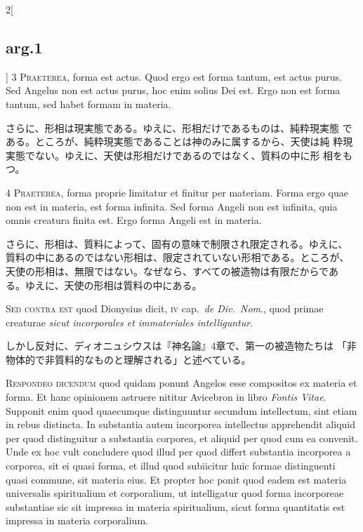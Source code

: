 \documentclass[paper=a4paper,fontsize=10pt,jafontsize=9pt,titlepage]{jlreq}
\begin{document}
\begin{paracol}{2}[\subsection{arg.1}]
{\scshape 3 Praeterea}, forma est actus. Quod ergo est forma tantum,
 est actus purus. Sed Angelus non est actus purus, hoc enim solius Dei
 est. Ergo non est forma tantum, sed habet formam in materia.

\switchcolumn

さらに、形相は現実態である。ゆえに、形相だけであるものは、純粋現実態
 である。ところが、純粋現実態であることは神のみに属するから、天使は純
 粋現実態でない。ゆえに、天使は形相だけであるのではなく、質料の中に形
 相をもつ。


{\scshape 4 Praeterea}, forma proprie limitatur et finitur per
 materiam. Forma ergo quae non est in materia, est forma infinita. Sed
 forma Angeli non est infinita, quia omnis creatura finita est. Ergo
 forma Angeli est in materia.

\switchcolumn

さらに、形相は、質料によって、固有の意味で制限され限定される。ゆえに、
 質料の中にあるのではない形相は、限定されていない形相である。ところが、
 天使の形相は、無限ではない。なぜなら、すべての被造物は有限だからであ
 る。ゆえに、天使の形相は質料の中にある。

\switchcolumn*[\subsection{s.c.}]

{\scshape Sed contra est} quod Dionysius dicit, {\scshape iv}
 cap.~{\itshape de Div.~Nom}., quod primae creaturae {\itshape sicut
 incorporales et immateriales intelliguntur}.

\switchcolumn

しかし反対に、ディオニュシウスは『神名論』4章で、第一の被造物たちは
 「非物体的で非質料的なものと理解される」と述べている。


{\scshape Respondeo dicendum} quod quidam ponunt Angelos esse
 compositos ex materia et forma. Et hanc opinionem astruere nititur
 Avicebron in libro {\itshape Fontis Vitae}. Supponit enim quod
 quaecumque distinguuntur secundum intellectum, sint etiam in rebus
 distincta. In substantia autem incorporea intellectus apprehendit
 aliquid per quod distinguitur a substantia corporea, et aliquid per
 quod cum ea convenit. Unde ex hoc vult concludere quod illud per quod
 differt substantia incorporea a corporea, sit ei quasi forma, et
 illud quod subiicitur huic formae distinguenti quasi commune, sit
 materia eius. Et propter hoc ponit quod eadem est materia universalis
 spiritualium et corporalium, ut intelligatur quod forma incorporeae
 substantiae sic sit impressa in materia spiritualium, sicut forma
 quantitatis est impressa in materia corporalium.


\end{paracol}
\end{document}
